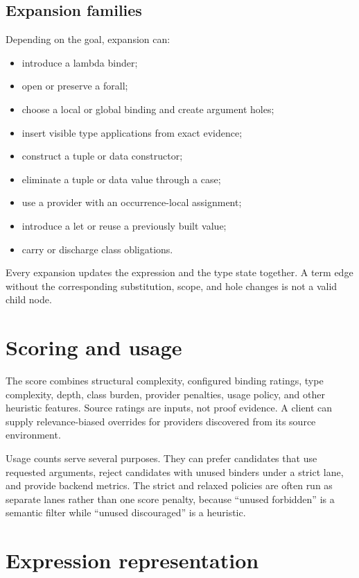\documentclass[10pt,letterpaper,oneside]{report}
\begin{document}
\subsection{Expansion families}

Depending on the goal, expansion can:

\begin{itemize}
  \item introduce a lambda binder;
  \item open or preserve a forall;
  \item choose a local or global binding and create argument holes;
  \item insert visible type applications from exact evidence;
  \item construct a tuple or data constructor;
  \item eliminate a tuple or data value through a case;
  \item use a provider with an occurrence-local assignment;
  \item introduce a let or reuse a previously built value;
  \item carry or discharge class obligations.
\end{itemize}

Every expansion updates the expression and the type state together. A term edge without the corresponding substitution, scope, and hole changes is not a valid child node.

\section{Scoring and usage}

The score combines structural complexity, configured binding ratings, type complexity, depth, class burden, provider penalties, usage policy, and other heuristic features. Source ratings are inputs, not proof evidence. A client can supply relevance-biased overrides for providers discovered from its source environment.

Usage counts serve several purposes. They can prefer candidates that use requested arguments, reject candidates with unused binders under a strict lane, and provide backend metrics. The strict and relaxed policies are often run as separate lanes rather than one score penalty, because ``unused forbidden'' is a semantic filter while ``unused discouraged'' is a heuristic.

\section{Expression representation}
\end{document}

